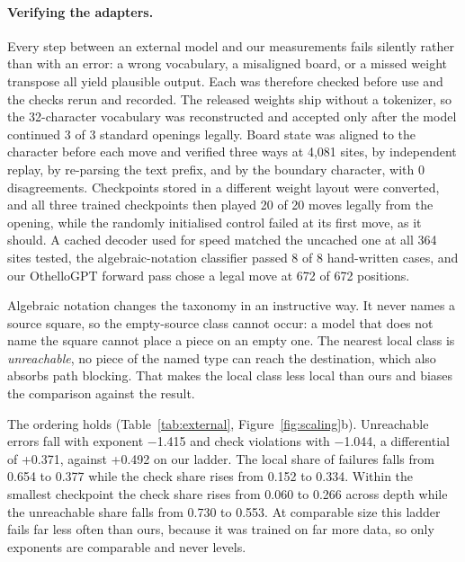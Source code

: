 \documentclass[11pt]{article}
\begin{document}
\paragraph{Verifying the adapters.}
Every step between an external model and our measurements fails silently rather
than with an error: a wrong vocabulary, a misaligned board, or a missed weight
transpose all yield plausible output. Each was therefore checked before use and
the checks rerun and recorded. The released weights ship without a tokenizer, so
the 32-character vocabulary was reconstructed and accepted only after
the model continued 3 of 3 standard openings
legally. Board state was aligned to the character before each move and verified
three ways at 4,081 sites, by independent replay, by re-parsing
the text prefix, and by the boundary character, with 0
disagreements. Checkpoints stored in a different weight layout were converted, and
all three trained checkpoints then played 20 of
20 moves legally from the opening, while the randomly initialised
control failed at its first move, as it should. A cached decoder used for speed
matched the uncached one at all 364 sites tested, the
algebraic-notation classifier passed 8 of 8
hand-written cases, and our OthelloGPT forward pass chose a legal move at
672 of 672 positions.

Algebraic notation changes the taxonomy in an instructive way. It never names a
source square, so the empty-source class cannot occur: a model that does not name
the square cannot place a piece on an empty one. The nearest local class is
\emph{unreachable}, no piece of the named type can reach the destination, which
also absorbs path blocking. That makes the local class less local than ours and
biases the comparison against the result.

The ordering holds (Table~\ref{tab:external}, Figure~\ref{fig:scaling}b).
Unreachable errors fall with exponent $-$1.415 and check violations with
$-$1.044, a differential of +0.371, against +0.492 on
our ladder. The local share of failures falls from 0.654 to
0.377 while the check share rises from 0.152 to
0.334. Within the smallest checkpoint the check share rises from
0.060 to 0.266 across depth while the unreachable
share falls from 0.730 to 0.553. At comparable size
this ladder fails far less often than ours, because it was trained on far more
data, so only exponents are comparable and never levels.
\end{document}
